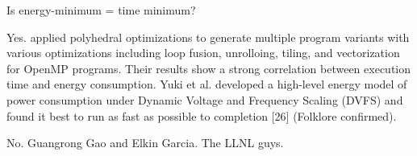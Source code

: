 Is energy-minimum = time minimum?

Yes. \cite{us} applied polyhedral optimizations to generate multiple program variants 
with various optimizations including loop fusion, unrolloing, tiling, and vectorization
for OpenMP programs. Their results show a strong correlation between execution time 
and energy consumption. 
Yuki et al. developed a high-level energy model of power consumption under Dynamic
Voltage and Frequency Scaling (DVFS) and found it best to
run as fast as possible to completion [26] (Folklore confirmed). 


No.
Guangrong Gao and Elkin Garcia.
The LLNL guys.




